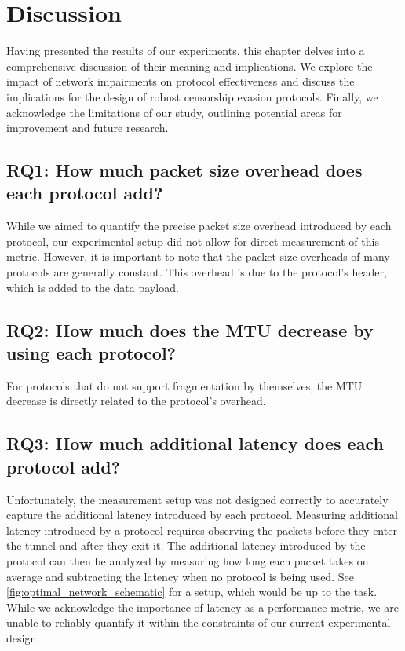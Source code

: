
\chapter{Discussion}
\label{chap:discussion}
Having presented the results of our experiments, this chapter delves into a comprehensive discussion of their meaning and implications.
We explore the impact of network impairments on protocol effectiveness and discuss the implications for the design of robust censorship evasion protocols.
Finally, we acknowledge the limitations of our study, outlining potential areas for improvement and future research.




\section{RQ1: How much packet size overhead does each protocol add?}
While we aimed to quantify the precise packet size overhead introduced by each protocol, our experimental setup did not allow for direct measurement of this metric.
However, it is important to note that the packet size overheads of many protocols are generally constant.
This overhead is due to the protocol's header, which is added to the data payload.

\section{RQ2: How much does the MTU decrease by using each protocol?}
For protocols that do not support fragmentation by themselves, the MTU decrease is directly related to the protocol's overhead.

\section{RQ3: How much additional latency does each protocol add?}
Unfortunately, the measurement setup was not designed correctly to accurately capture the additional latency introduced by each protocol.
Measuring additional latency introduced by a protocol requires observing the packets before they enter the tunnel and after they exit it.
The additional latency introduced by the protocol can then be analyzed by measuring how long each packet takes on average and subtracting the latency when no protocol is being used.
See \cref{fig:optimal_network_schematic} for a setup, which would be up to the task.
While we acknowledge the importance of latency as a performance metric, we are unable to reliably quantify it within the constraints of our current experimental design.

